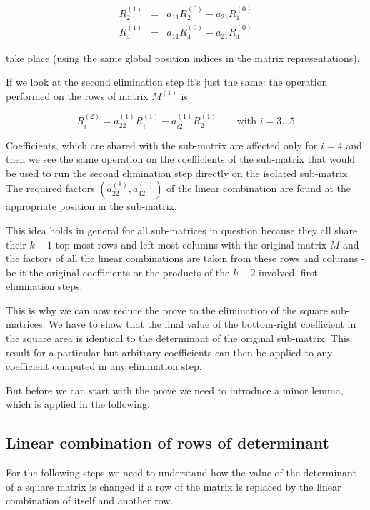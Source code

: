\begin{eqnarray*}
R^{(1)}_{2} &=& a_{11} R^{(0)}_{2} - a_{21} R^{(0)}_{1} \\
R^{(1)}_{4} &=& a_{11} R^{(0)}_{4} - a_{21} R^{(0)}_{4}
\end{eqnarray*}

\noindent
take place (using the same global position indices in the matrix
representations).

If we look at the second elimination step it's just the same: the operation
performed on the rows of matrix $M^{(1)}$ is

\begin{equation*}
R^{(2)}_{i} = a^{(1)}_{22} R^{(1)}_{i} - a^{(1)}_{i2} R^{(1)}_{2}
\qquad \text{with } i=3 \ldots 5
\end{equation*}

\noindent
Coefficients, which are shared with the sub-matrix are affected only for
$i=4$ and then we see the same operation on the coefficients of the
sub-matrix that would be used to run the second elimination step directly
on the isolated sub-matrix. The required factors $(a^{(1)}_{22},
a^{(1)}_{42})$ of the linear combination are found at the appropriate
position in the sub-matrix.

This idea holds in general for all sub-matrices in question because they
all share their $k-1$ top-most rows and left-most columns with the
original matrix $M$ and the factors of all the linear combinations are
taken from these rows and columns - be it the original coefficients or the
products of the $k-2$ involved, first elimination steps.

This is why we can now reduce the prove to the elimination of the square
sub-matrices. We have to show that the final value of the bottom-right
coefficient in the square area is identical to the determinant of the
original sub-matrix. This result for a particular but arbitrary
coefficients can then be applied to any coefficient computed in any
elimination step.

But before we can start with the prove we need to introduce a minor lemma,
which is applied in the following.


\subsection{Linear combination of rows of determinant}

For the following steps we need to understand how the value of the
determinant of a square matrix is changed if a row of the matrix is
replaced by the linear combination of itself and another row.

